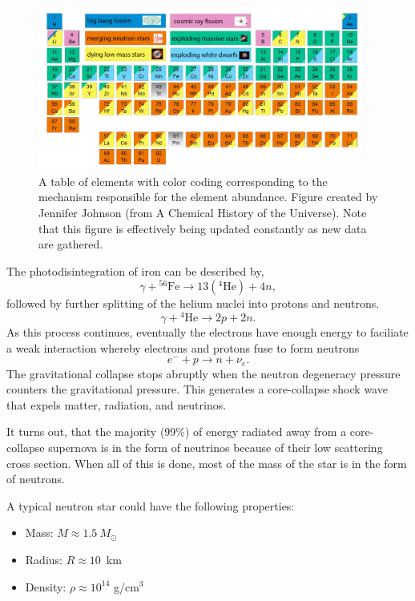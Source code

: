 \documentclass[a4paper,12pt]{article}
\theoremstyle{remark}
\newcommand{\mrm}[1]{\mathrm{#1}}
\renewcommand{\=}[1]{\stackrel{#1}{=}} %
\theoremstyle{plain}
\theoremstyle{definition}
\begin{document}
\begin{figure}[t]
\begin{center}
    \includegraphics*[angle=0,width=0.95\textwidth]{img/origin_of_elements.png}
    \caption[The origin of elements]{A table of elements with color coding corresponding to the mechanism responsible for the element abundance. Figure created by Jennifer Johnson (from A Chemical History of the Universe). Note that this figure is effectively being updated constantly as new data are gathered.}
\label{fig:fig1}
\end{center}
\end{figure}


The photodisintegration of iron can be described by,
\begin{equation}
\gamma + {}^{56}\mrm{Fe} \rightarrow 13({}^4\mrm{He}) + 4n,
\end{equation}
followed by further splitting of the helium nuclei into protons and neutrons. 
\begin{equation}
\gamma + {}^4 \mrm{He} \rightarrow 2p + 2n.
\end{equation}
As this process continues, eventually the electrons have enough energy to faciliate a weak interaction whereby electrons and protons fuse to form neutrons
\begin{equation}
e^{-} + p \rightarrow n + \nu _e.
\end{equation} 
The gravitational collapse stops abruptly when the neutron degeneracy pressure counters the gravitational pressure. This generates a core-collapse shock wave that expels matter, radiation, and neutrinos. 

It turns out, that the majority (99\%) of energy radiated away from a core-collapse supernova is in the form of neutrinos because of their low scattering cross section. When all of this is done, most of the mass of the star is in the form of neutrons.

A typical neutron star could have the following properties:
\vspace{-7mm}
\begin{itemize}
\item Mass:  $M \approx 1.5 \: M_\odot$
\item Radius: $R \approx 10$~km
\item Density: $\rho \approx 10^{14}$ g/cm$^{3}$
\end{itemize}
\end{document}
